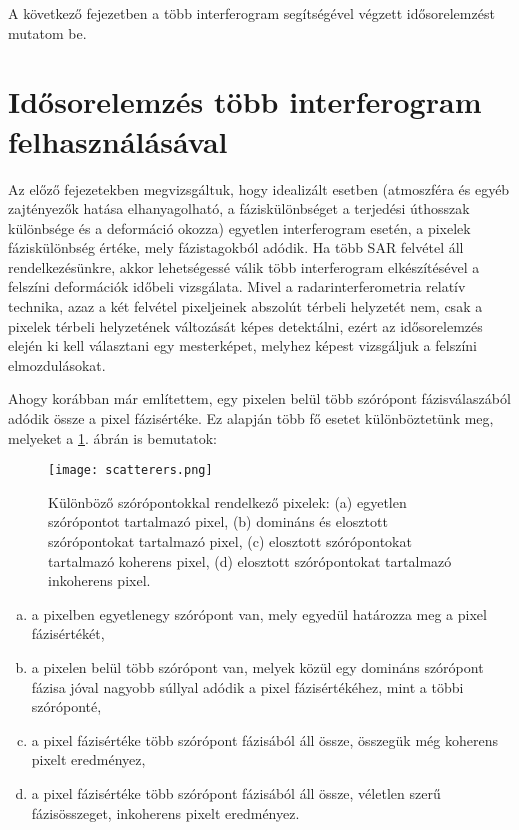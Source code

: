 \documentclass[12pt]{report}
\numberwithin{equation}{section}
\numberwithin{table}{section}
\numberwithin{figure}{section}
\begin{document}
A következő fejezetben a több interferogram segítségével végzett idősorelemzést mutatom be.

\section{Idősorelemzés több interferogram felhasználásával}

Az előző fejezetekben megvizsgáltuk, hogy idealizált esetben (atmoszféra és egyéb zajtényezők hatása elhanyagolható, a fáziskülönbséget a terjedési úthosszak különbsége és a deformáció okozza) egyetlen interferogram esetén, a pixelek fáziskülönbség értéke, mely fázistagokból adódik. Ha több SAR felvétel áll rendelkezésünkre, akkor lehetségessé válik több interferogram elkészítésével a felszíni deformációk időbeli vizsgálata. Mivel a radarinterferometria relatív technika, azaz a két felvétel pixeljeinek abszolút térbeli helyzetét nem, csak a pixelek térbeli helyzetének változását képes detektálni, ezért az idősorelemzés elején ki kell választani egy mesterképet, melyhez képest vizsgáljuk a felszíni elmozdulásokat.

Ahogy korábban már említettem, egy pixelen belül több szórópont fázisválaszából adódik össze a pixel fázisértéke. Ez alapján több fő esetet különböztetünk meg, melyeket a \ref{scatterer_types}. ábrán is bemutatok:

\begin{figure}[H]
    \centering
    \texttt{[image: scatterers.png]}
    \caption{Különböző szórópontokkal rendelkező pixelek: (a) egyetlen szórópontot tartalmazó pixel, (b) domináns és elosztott szórópontokat tartalmazó pixel, (c) elosztott szórópontokat tartalmazó koherens pixel, (d) elosztott szórópontokat tartalmazó inkoherens pixel. \cite{Banyai2014}}\label{scatterer_types}
\end{figure}

\begin{enumerate}[(a)]
    \item a pixelben egyetlenegy szórópont van, mely egyedül határozza meg a pixel fázisértékét,
    \item a pixelen belül több szórópont van, melyek közül egy domináns szórópont fázisa jóval nagyobb súllyal adódik a pixel fázisértékéhez, mint a többi szóróponté,
    \item a pixel fázisértéke több szórópont fázisából áll össze, összegük még koherens pixelt eredményez,
    \item a pixel fázisértéke több szórópont fázisából áll össze, véletlen szerű fázisösszeget, inkoherens pixelt eredményez.
\end{enumerate}
\end{document}
